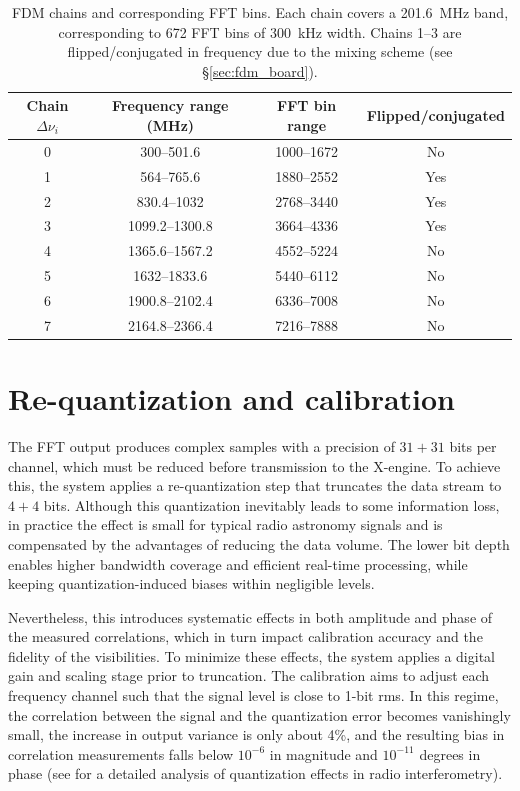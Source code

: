 \begin{table}[t]
\centering
\caption[FDM chains and corresponding FFT bins]{FDM chains and corresponding FFT bins. Each chain covers a \SI{201.6}{\mega\hertz} band, corresponding to \num{672} FFT bins of \SI{300}{\kilo\hertz} width. Chains 1--3 are flipped/conjugated in frequency due to the mixing scheme (see \S\ref{sec:fdm_board}).}
\begin{tabular}{cccc}
\toprule
\textbf{Chain $\Delta\nu_i$} & \textbf{Frequency range (\unit{\mega\hertz})} & \textbf{FFT bin range} & \textbf{Flipped/conjugated} \\
\midrule
0 & 300--501.6 & 1000--1672 & No \\
1 & 564--765.6 & 1880--2552 & Yes \\
2 & 830.4--1032 & 2768--3440 & Yes \\
3 & 1099.2--1300.8 & 3664--4336 & Yes \\
4 & 1365.6--1567.2 & 4552--5224 & No \\
5 & 1632--1833.6 & 5440--6112 & No \\
6 & 1900.8--2102.4 & 6336--7008 & No \\
7 & 2164.8--2366.4 & 7216--7888 & No \\
\bottomrule
\end{tabular}
\label{tab:fdm_chains}
\end{table}

\section{Re-quantization and calibration}
\label{sec:re-quantization}

The FFT output produces complex samples with a precision of $31+31$ bits per channel, which must be reduced before transmission to the X-engine. To achieve this, the system applies a re-quantization step that truncates the data stream to $4+4$ bits. Although this quantization inevitably leads to some information loss, in practice the effect is small for typical radio astronomy signals and is compensated by the advantages of reducing the data volume. The lower bit depth enables higher bandwidth coverage and efficient real-time processing, while keeping quantization-induced biases within negligible levels.

Nevertheless, this introduces systematic effects in both amplitude and phase of the measured correlations, which in turn impact calibration accuracy and the fidelity of the visibilities. To minimize these effects, the system applies a digital gain and scaling stage prior to truncation. The calibration aims to adjust each frequency channel such that the signal level is close to 1-bit \gls{rms}. In this regime, the correlation between the signal and the quantization error becomes vanishingly small, the increase in output variance is only about 4\%, and the resulting bias in correlation measurements falls below $10^{-6}$ in magnitude and $10^{-11}$ degrees in phase (see \citealt{menaparra2018quantizationbiasdigitalcorrelators} for a detailed analysis of quantization effects in radio interferometry).

